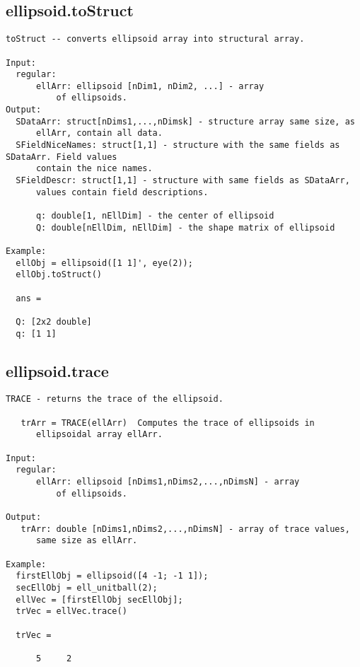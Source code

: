 \subsection{\texorpdfstring{ellipsoid.toStruct}{toStruct}}\label{method:ellipsoid.toStruct}
\begin{verbatim}
toStruct -- converts ellipsoid array into structural array.

Input:
  regular:
      ellArr: ellipsoid [nDim1, nDim2, ...] - array
          of ellipsoids.
Output:
  SDataArr: struct[nDims1,...,nDimsk] - structure array same size, as
      ellArr, contain all data.
  SFieldNiceNames: struct[1,1] - structure with the same fields as SDataArr. Field values
      contain the nice names.
  SFieldDescr: struct[1,1] - structure with same fields as SDataArr,
      values contain field descriptions.

      q: double[1, nEllDim] - the center of ellipsoid
      Q: double[nEllDim, nEllDim] - the shape matrix of ellipsoid

Example:
  ellObj = ellipsoid([1 1]', eye(2));
  ellObj.toStruct()

  ans =

  Q: [2x2 double]
  q: [1 1]
\end{verbatim}
\subsection{\texorpdfstring{ellipsoid.trace}{trace}}\label{method:ellipsoid.trace}
\begin{verbatim}
TRACE - returns the trace of the ellipsoid.

   trArr = TRACE(ellArr)  Computes the trace of ellipsoids in
      ellipsoidal array ellArr.

Input:
  regular:
      ellArr: ellipsoid [nDims1,nDims2,...,nDimsN] - array
          of ellipsoids.

Output:
   trArr: double [nDims1,nDims2,...,nDimsN] - array of trace values,
      same size as ellArr.

Example:
  firstEllObj = ellipsoid([4 -1; -1 1]);
  secEllObj = ell_unitball(2);
  ellVec = [firstEllObj secEllObj];
  trVec = ellVec.trace()

  trVec =

      5     2
\end{verbatim}
